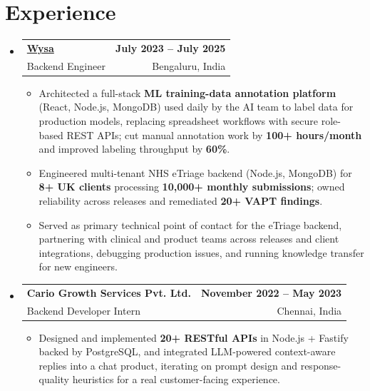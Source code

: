 \documentclass[letterpaper,10pt]{article}
\makeatletter
\newcommand{\resumeItem}[1]{
  \item\small{#1\vspace{-1pt}}
}
\newcommand{\resumeSubheading}[4]{
  \vspace{1pt}\item
    \begin{tabular*}{0.985\textwidth}[t]{l@{\extracolsep{\fill}}r}
      \textbf{#1} & \textbf{\small #2} \\
      {\small\color{ResumeSlate} #3} & {\small\color{ResumeSlate} #4} \\
    \end{tabular*}\vspace{-6pt}
}
\newcommand{\resumeSubHeadingListStart}{\begin{itemize}[leftmargin=0.0in, label={}, itemsep=2pt, topsep=2pt]}
\newcommand{\resumeSubHeadingListEnd}{\end{itemize}}
\newcommand{\resumeItemListStart}{\begin{itemize}[leftmargin=0.18in, itemsep=2pt, topsep=1pt]}
\newcommand{\resumeItemListEnd}{\end{itemize}\vspace{-4pt}}
\makeatother
\begin{document}
\section{Experience}
\resumeSubHeadingListStart
  \resumeSubheading
    {\href{https://www.wysa.io}{Wysa}}{July 2023 -- July 2025}
    {Backend Engineer}{Bengaluru, India}
    \resumeItemListStart
      \resumeItem{Architected a full-stack \textbf{ML training-data annotation platform} (React, Node.js, MongoDB) used daily by the AI team to label data for production models, replacing spreadsheet workflows with secure role-based REST APIs; cut manual annotation work by \textbf{100+ hours/month} and improved labeling throughput by \textbf{60\%}.}
      \resumeItem{Engineered multi-tenant NHS eTriage backend (Node.js, MongoDB) for \textbf{8+ UK clients} processing \textbf{10{,}000+ monthly submissions}; owned reliability across releases and remediated \textbf{20+ VAPT findings}.}
      \resumeItem{Served as primary technical point of contact for the eTriage backend, partnering with clinical and product teams across releases and client integrations, debugging production issues, and running knowledge transfer for new engineers.}
    \resumeItemListEnd
  \resumeSubheading
    {Cario Growth Services Pvt. Ltd.}{November 2022 -- May 2023}
    {Backend Developer Intern}{Chennai, India}
    \resumeItemListStart
      \resumeItem{Designed and implemented \textbf{20+ RESTful APIs} in Node.js + Fastify backed by PostgreSQL, and integrated LLM-powered context-aware replies into a chat product, iterating on prompt design and response-quality heuristics for a real customer-facing experience.}
    \resumeItemListEnd
\resumeSubHeadingListEnd
\vspace{-4pt}
\end{document}
